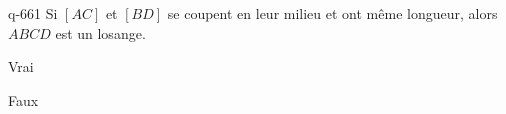 \begin{truefalse}{q-661}
Si $[AC]$ et $[BD]$ se coupent en leur milieu et ont même longueur, alors $ABCD$ est un losange.
\item Vrai
\item* Faux
\end{truefalse}

